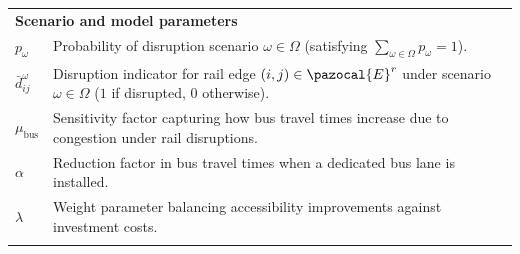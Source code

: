 \documentclass[3p,times,procedia]{elsarticle}
\begin{document}
\begin{table}[h]
\begin{tabularx}{\hsize}{@{\extracolsep{\fill}}lX@{}}
\multicolumn{2}{l}{\textbf{Scenario and model parameters}} \\
$p_\omega$ & Probability of disruption scenario $\omega \in \Omega$ 
(satisfying $\sum_{\omega \in \Omega} p_\omega = 1$). \\
$\bar{d}_{ij}^\omega$ & Disruption indicator for rail edge $(i,j) \in \pazocal{E}^r$ under scenario $\omega \in \Omega$ ($1$ if disrupted, $0$ otherwise). \\
$\mu_{\text{bus}}$ & Sensitivity factor capturing how bus travel times increase due to congestion under rail disruptions. \\
$\alpha$ & Reduction factor in bus travel times when a dedicated bus lane is installed. \\
$\lambda$ & Weight parameter balancing accessibility improvements against investment costs. \\
\botrule
\end{tabularx}
\end{table}
\end{document}
